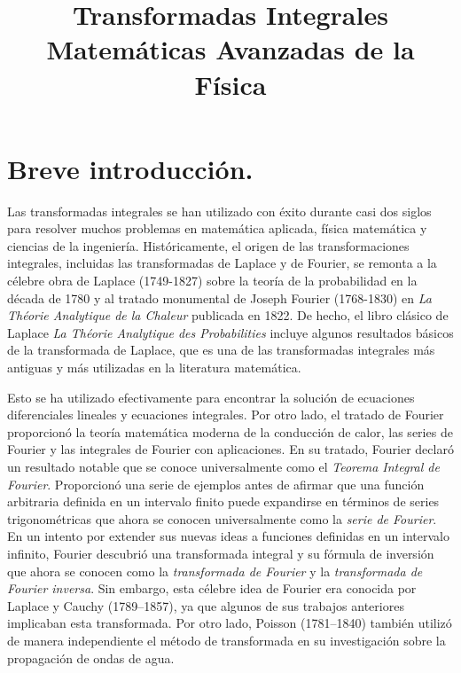 
\newcommand{\saltosin}{\nonumber \\}
\author{}
\title{Transformadas Integrales \\ {\large Matemáticas Avanzadas de la Física}\vspace{-1.5\baselineskip}}
\date{ }

\maketitle
\fontsize{14}{14}\selectfont
\section{Breve introducción.}
Las transformadas integrales se han utilizado con éxito durante casi dos siglos para resolver muchos problemas en matemática aplicada, física matemática y ciencias de la ingeniería. Históricamente, el origen de las transformaciones integrales, incluidas las transformadas de Laplace y de Fourier, se remonta a la célebre obra de Laplace (1749-1827) sobre la teoría de la probabilidad en la década de 1780 y al tratado monumental de Joseph Fourier (1768-1830) en \emph{La Théorie Analytique de la Chaleur} publicada en 1822. De hecho, el libro clásico de Laplace \emph{La Théorie Analytique des Probabilities} incluye algunos resultados básicos de la transformada de Laplace, que es una de las transformadas integrales más antiguas y más utilizadas en la literatura matemática. 
\par
Esto se ha utilizado efectivamente para encontrar la solución de ecuaciones diferenciales lineales y ecuaciones integrales. Por otro lado, el tratado de Fourier proporcionó la teoría matemática moderna de la conducción de calor, las series de Fourier y las integrales de Fourier con aplicaciones. En su tratado, Fourier declaró un resultado notable que se conoce universalmente como el \emph{Teorema Integral de Fourier}. Proporcionó una serie de ejemplos antes de afirmar que una función arbitraria definida en un intervalo finito puede expandirse en términos de series trigonométricas que ahora se conocen universalmente como la \emph{serie de Fourier}. En un intento por extender sus nuevas ideas a funciones definidas en un intervalo infinito, Fourier descubrió una transformada integral y su fórmula de inversión que ahora se conocen como la \emph{transformada de Fourier} y la \emph{transformada de Fourier inversa}. Sin embargo, esta célebre idea de Fourier era conocida por Laplace y Cauchy (1789–1857), ya que algunos de sus trabajos anteriores implicaban esta transformada. Por otro lado, Poisson (1781–1840) también utilizó de manera independiente el método de transformada en su investigación sobre la propagación de ondas de agua.
